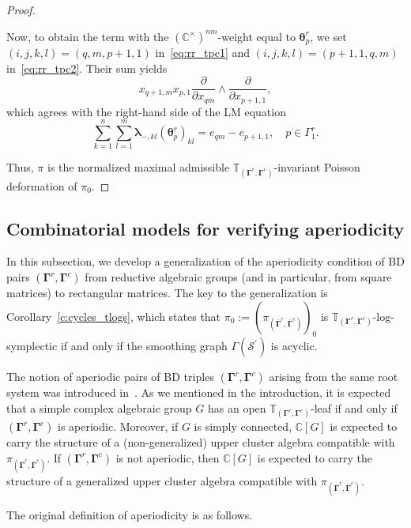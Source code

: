 \documentclass[11pt]{article}
\newcommand{\blambda}{\boldsymbol{\lambda}}
\newcommand{\btheta}{{\boldsymbol{\theta}}}
\newcommand{\bbg}{\bar{\mathbf{\Gamma}}}
\newcommand{\bg}{\mathbf{\Gamma}}
\theoremstyle{definition}\newtheorem{definition}[theorem]{Definition}
\theoremstyle{definition}\newtheorem{remark}[theorem]{Remark}
\theoremstyle{remark}
\numberwithin{equation}{section}
\begin{document}
\begin{proof}
\begin{description}
\begin{equation}
        \end{equation}
        Now, to obtain the term with the $(\mathbb{C}^{\times})^{nm}$-weight equal to $\btheta_p^r$, we set $(i,j,k,l) = (q,m,p+1,1)$ in~\eqref{eq:rr_tpc1} and $(i,j,k,l) = (p+1,1,q,m)$ in~\eqref{eq:rr_tpc2}. Their sum yields
        \begin{equation*}
            x_{q+1,m}x_{p,1} \frac{\partial}{\partial x_{qm}}\wedge \frac{\partial}{\partial x_{p+1,1}},
        \end{equation*}
        which agrees with the right-hand side of the LM equation
        \begin{equation*}
            \sum_{k=1}^n\sum_{l=1}^m\blambda_{-,kl}( \btheta_{p}^r)_{kl} = e_{qm} - e_{p+1,1} , \quad p \in \Gamma_1^r.
        \end{equation*}
    \end{description}
    Thus, $\pi$ is the normalized maximal admissible $\mathbb{T}_{(\bg^r,\bg^c)}$-invariant Poisson deformation of $\pi_0$.
\end{proof}

\subsection{Combinatorial models for verifying aperiodicity}\label{s:meander}
In this subsection, we develop a generalization of the aperiodicity condition of BD pairs $(\bg^r,\bg^c)$ from reductive algebraic groups (and in particular, from square matrices) to rectangular matrices. The key to the generalization is Corollary~\ref{c:cycles_tlogs}, which states that $\pi_0 := (\pi_{(\bbg^r,\bbg^c)})_0$ is $\mathbb{T}_{(\bg^r,\bg^c)}$-log-symplectic if and only if the smoothing graph $\Gamma(\mathcal{S}^\prime)$ is acyclic. 

The notion of aperiodic pairs of BD triples $(\bg^r,\bg^c)$ arising from the same root system was introduced in~\cite{gsv-plethora}. As we mentioned in the introduction, it is expected that a simple complex algebraic group $G$ has an open $\mathbb{T}_{(\bg^r,\bg^c)}$-leaf if and only if $(\bg^r,\bg^c)$ is aperiodic. Moreover, if $G$ is simply connected, $\mathbb{C}[G]$ is expected to carry the structure of a (non-generalized) upper cluster algebra compatible with $\pi_{(\bbg^r,\bbg^c)}$. If $(\bg^r,\bg^c)$ is not aperiodic, then $\mathbb{C}[G]$ is expected to carry the structure of a generalized upper cluster algebra compatible with $\pi_{(\bbg^r,\bbg^c)}$.

The original definition of aperiodicity is as follows. 
\end{document}
